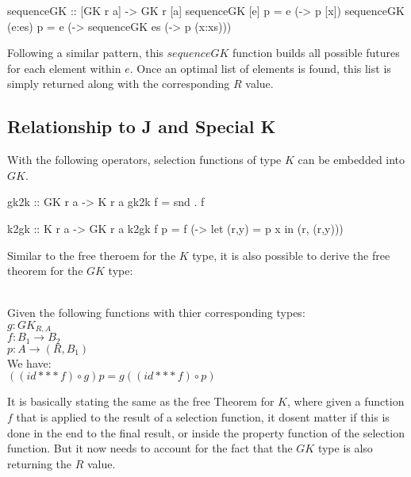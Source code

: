 \documentclass[runningheads]{llncs}
\newcommand{\ignore}[1]{}
\begin{document}
\begin{code}
sequenceGK :: [GK r a] -> GK r [a]
sequenceGK [e] p    = e (\x -> p [x])
sequenceGK (e:es) p = e (\x -> sequenceGK es (\xs -> p (x:xs)))
\end{code}

Following a similar pattern, this \(sequenceGK\) function builds all
possible futures for each element within \(e\). Once an optimal list of
elements is found, this list is simply returned along with the
corresponding \(R\) value.

\subsection{Relationship to J and Special
K}\label{relationship-to-j-and-special-k}

With the following operators, selection functions of type \(K\) can be
embedded into \(GK\).

\ignore{

> gk2k :: forall r a b. ((a -> (r,b)) -> (r,b)) -> ((a -> (r,b)) -> b)
> gk2k f = snd . f

}

\begin{haskell}
gk2k :: GK r a -> K r a 
gk2k f = snd . f
\end{haskell}

\begin{code}
k2gk :: K r a -> GK r a
k2gk f p = f (\x -> let (r,y) = p x in (r, (r,y)))
\end{code}

Similar to the free theroem for the \(K\) type, it is also possible to
derive the free theorem for the \(GK\) type:

\begin{theorem}\\
Given the following functions with thier corresponding types:\\
$g : GK_{R,A}$\\
$f : B_1 \rightarrow B_2$\\
$p : A \rightarrow (R, B_1)$\\
We have:\\
$((id *** f) \circ g) p = g ((id *** f) \circ p)$\\
\end{theorem}

It is basically stating the same as the free Theorem for \(K\), where
given a function \(f\) that is applied to the result of a selection
function, it dosent matter if this is done in the end to the final
result, or inside the property function of the selection function. But
it now needs to account for the fact that the \(GK\) type is also
returning the \(R\) value.
\end{document}
